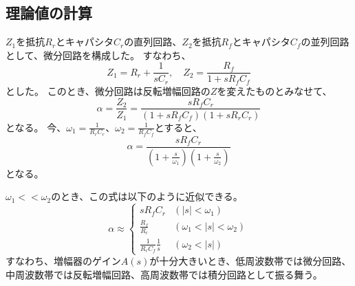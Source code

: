 \documentclass[a4paper]{ltjsarticle}
\begin{document}
\subsection{理論値の計算}
$Z_1$を抵抗$R_r$とキャパシタ$C_r$の直列回路、$Z_2$を抵抗$R_f$とキャパシタ$C_f$の並列回路として、微分回路を構成した。
すなわち、
\begin{equation*}
    Z_1 = R_r + \frac{1}{sC_r},\quad Z_2 = \frac{R_f}{1+sR_fC_f}
\end{equation*}
とした。
このとき、微分回路は反転増幅回路の$Z$を変えたものとみなせて、
\begin{equation}
    \alpha = \frac{Z_2}{Z_1} = \frac{sR_fC_r}{(1+sR_fC_f)(1+sR_rC_r)}
\end{equation}
となる。
今、$\omega_1 = \frac{1}{R_rC_r}$、$\omega_2 = \frac{1}{R_fC_f}$とすると、
\begin{equation}
    \alpha = \frac{sR_fC_r}{\left( 1+\frac{s}{\omega_1} \right)\left( 1+\frac{s}{\omega_2} \right)}
\end{equation}
となる。

$\omega_1 << \omega_2$のとき、この式は以下のように近似できる。
\begin{equation}
    \alpha \approx \begin{cases}
        sR_fC_r & (|s| < \omega_1) \\
        \frac{R_f}{R_r} & (\omega_1 < |s| < \omega_2) \\
        \frac{1}{R_rC_f}\frac{1}{s} & (\omega_2 < |s|)
    \end{cases}
\end{equation}
すなわち、増幅器のゲイン$A(s)$が十分大きいとき、低周波数帯では微分回路、中周波数帯では反転増幅回路、高周波数帯では積分回路として振る舞う。
\end{document}
